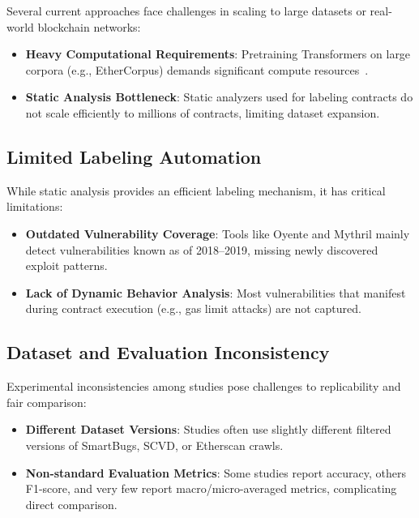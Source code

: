 Several current approaches face challenges in scaling to large datasets or real-world blockchain networks:

\begin{itemize}
    \item \textbf{Heavy Computational Requirements}: Pretraining Transformers on large corpora (e.g., EtherCorpus) demands significant compute resources~\cite{tann2020towards}.
    
    \item \textbf{Static Analysis Bottleneck}: Static analyzers used for labeling contracts do not scale efficiently to millions of contracts, limiting dataset expansion.
\end{itemize}

\subsection*{Limited Labeling Automation}

While static analysis provides an efficient labeling mechanism, it has critical limitations:

\begin{itemize}
    \item \textbf{Outdated Vulnerability Coverage}: Tools like Oyente and Mythril mainly detect vulnerabilities known as of 2018--2019, missing newly discovered exploit patterns.
    
    \item \textbf{Lack of Dynamic Behavior Analysis}: Most vulnerabilities that manifest during contract execution (e.g., gas limit attacks) are not captured.
\end{itemize}

\subsection*{Dataset and Evaluation Inconsistency}

Experimental inconsistencies among studies pose challenges to replicability and fair comparison:

\begin{itemize}
    \item \textbf{Different Dataset Versions}: Studies often use slightly different filtered versions of SmartBugs, SCVD, or Etherscan crawls.
    
    \item \textbf{Non-standard Evaluation Metrics}: Some studies report accuracy, others F1-score, and very few report macro/micro-averaged metrics, complicating direct comparison.
\end{itemize}

